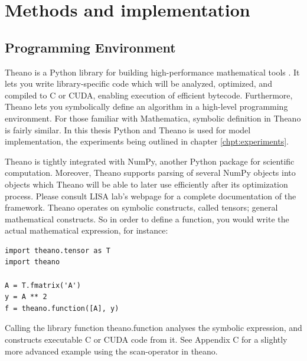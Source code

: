 
\chapter{Methods and implementation}\label{chpt:methods}

\section{Programming Environment}

Theano is a Python library for building high-performance mathematical tools \citep{Bergstra2010}. It lets you write library-specific code which will be analyzed, optimized, and compiled to C or CUDA, enabling execution of efficient bytecode. Furthermore, Theano lets you symbolically define an algorithm in a high-level programming environment. For those familiar with Mathematica, symbolic definition in Theano is fairly similar. In this thesis Python and Theano is used for model implementation, the experiments being outlined in chapter \ref{chpt:experiments}.

Theano is tightly integrated with NumPy, another Python package for scientific computation. Moreover, Theano supports parsing of several NumPy objects into objects which Theano will be able to later use efficiently after its optimization process. Please consult LISA lab's webpage \citep{LISA-lab2015a} for a complete documentation of the framework.
Theano operates on symbolic constructs, called tensors; general mathematical constructs. So in order to define a function, you would write the actual mathematical expression, for instance:

\begin{verbatim}
import theano.tensor as T
import theano

A = T.fmatrix('A')
y = A ** 2
f = theano.function([A], y)
\end{verbatim}

Calling the library function theano.function analyses the symbolic expression, and constructs executable C or CUDA code from it. See Appendix C for a slightly more advanced example using the scan-operator in theano.

